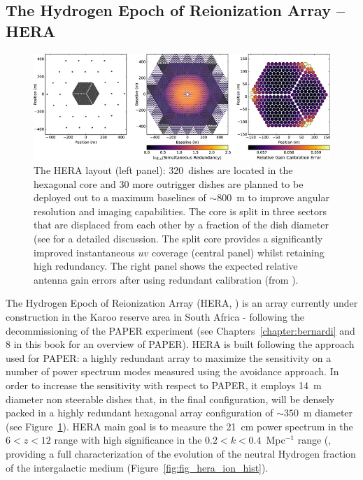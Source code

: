 \subsection{The Hydrogen Epoch of Reionization Array -- HERA}
\begin{figure}[]
\begin{center}
\includegraphics[width=1.\textwidth]{Koopmans_Bernardi/hera_layout}
\end{center}
\caption{The HERA layout (left panel): 320~dishes are located in the hexagonal core and 30 more outrigger dishes are planned to be deployed out to a maximum baselines of $\sim 800$~m to improve angular resolution and imaging capabilities. The core is split in three sectors that are displaced from each other by a fraction of the dish diameter (see \cite{dillon16} for a detailed discussion. The split core provides a significantly improved instantaneous $uv$ coverage (central panel) whilst retaining high redundancy. The right panel shows the expected relative antenna gain errors after using redundant calibration (from \cite{dillon16}).}
\label{fig:fig_hera}
\end{figure}
The Hydrogen Epoch of Reionization Array (HERA, \cite{deboer17}) is an array currently under construction in the Karoo reserve area in South Africa - following the decommissioning of the PAPER experiment (see Chapters~\ref{chapter:bernardi} and 8 in this book for an overview of PAPER). HERA is built following the approach used for PAPER: a highly redundant array to maximize the sensitivity on a number of power spectrum modes measured using the avoidance approach. In order to increase the sensitivity with respect to PAPER, it employs 14~m diameter non steerable dishes that, in the final configuration, will be densely packed in a highly redundant hexagonal array configuration of $\sim 350$~m diameter (see Figure~\ref{fig:fig_hera}). 
HERA main goal is to measure the 21~cm power spectrum in the $6 < z < 12 $ range with high significance in the $0.2 < k < 0.4$~Mpc$^{-1}$ range (\cite{pober14}, providing a full characterization of the evolution of the neutral Hydrogen fraction of the intergalactic medium (Figure~\ref{fig:fig_hera_ion_hist}).
